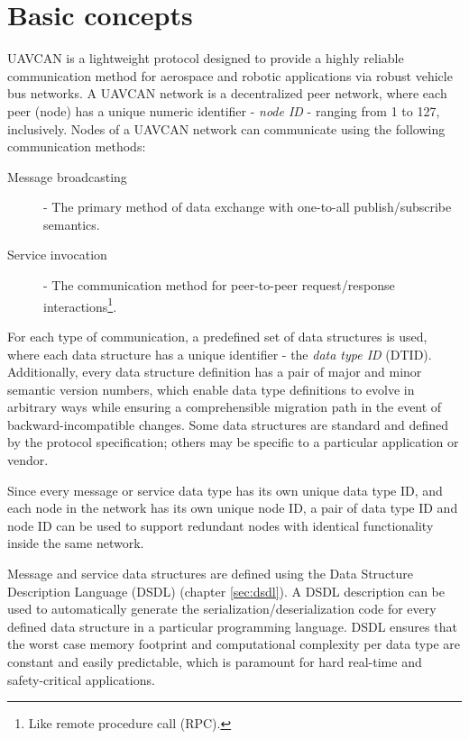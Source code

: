 \chapter{Basic concepts}\label{sec:basic_concepts}

UAVCAN is a lightweight protocol designed to provide a highly reliable communication method for
aerospace and robotic applications via robust vehicle bus networks.
A UAVCAN network is a decentralized peer network, where each peer (node) has a unique
numeric identifier - \emph{node ID} - ranging from 1 to 127, inclusively.
Nodes of a UAVCAN network can communicate using the following communication methods:
\begin{description}
    \item[Message broadcasting] - The primary method of data exchange with one-to-all publish/subscribe semantics.
    \item[Service invocation] - The communication method for peer-to-peer request/response
    interactions\footnote{Like remote procedure call (RPC).}.
\end{description}

For each type of communication, a predefined set of data structures is used,
where each data structure has a unique identifier - the \emph{data type ID} (DTID).
Additionally, every data structure definition has a pair of major and minor semantic version numbers,
which enable data type definitions to evolve in arbitrary ways while ensuring a comprehensible
migration path in the event of backward-incompatible changes.
Some data structures are standard and defined by the protocol specification;
others may be specific to a particular application or vendor.

Since every message or service data type has its own unique data type ID,
and each node in the network has its own unique node ID,
a pair of data type ID and node ID can be used to support redundant nodes with identical
functionality inside the same network.

Message and service data structures are defined using the Data Structure Description Language
(DSDL) (chapter \ref{sec:dsdl}).
A DSDL description can be used to automatically generate the serialization/deserialization code
for every defined data structure in a particular programming language.
DSDL ensures that the worst case memory footprint and computational complexity per data type
are constant and easily predictable, which is paramount for hard real-time and safety-critical applications.

